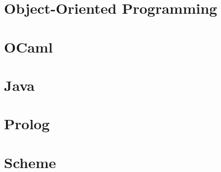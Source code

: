 \documentclass[9pt]{extarticle}
\begin{document}
\newpage
\section{Object-Oriented Programming}


\appendix
 
\newpage
\section{OCaml}


\newpage
\section{Java}


\newpage
\section{Prolog}


\newpage
\section{Scheme}

\end{document}
